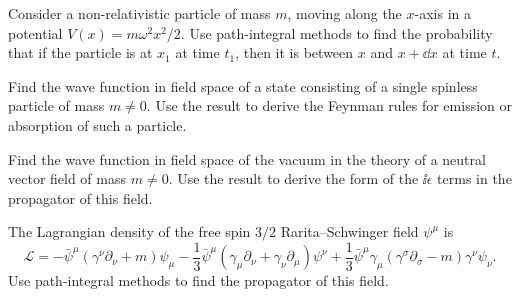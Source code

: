 
\begin{enumerate}
 Consider a non-relativistic particle of mass $m$, moving along the
  $x$-axis in a potential $V(x)=m\omega^2x^2/2$. Use path-integral methods
  to find the probability that if the particle is at $x_1$ at time $t_1$,
  then it is between $x$ and $x+\dd x$ at time $t$.

 Find the wave function in field space of a state consisting of a single
  spinless particle of mass $m\neq0$. Use the result to derive the Feynman
  rules for emission or absorption of such a particle.

 Find the wave function in field space of the vacuum in the theory of a
  neutral vector field of mass $m\neq0$. Use the result to derive the form of
  the $\ii\epsilon$ terms in the propagator of this field.

 The Lagrangian density of the free spin $3/2$ Rarita--Schwinger field
  $\psi^\mu$ is
  \[
    \mathcal{L}=-\bar\psi^\mu(\gamma^\nu\partial_\nu+m)\psi_\mu
    -\frac{1}{3}\bar\psi^\mu(\gamma_\mu\partial_\nu
      +\gamma_\nu\partial_\mu)\psi^\nu
    +\frac{1}{3}\bar\psi^\mu\gamma_\mu
      (\gamma^\sigma\partial_\sigma-m)\gamma^\nu\psi_\nu.
  \]
  Use path-integral methods to find the propagator of this field.
\end{enumerate}
